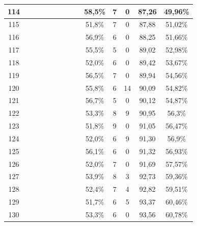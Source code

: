 \begin{longtable}{|c|c|c|c|c|c|c|c|c|c|c|c|c|c|}
114 &  \x    & \x    & \x    & \x    &       &       & \x\m  &       & 58,5\% &  7  & 0  & 87,26 & 49,96\% \\ \hline
115 &  \x    & \x    &       &       &       &       & \x    &       & 51,8\% &  7  & 0  & 87,88 & 51,02\% \\ \hline
116 &  \x    & \x    &       & \x    & \x    & \x    & \x    &       & 56,9\% &  6  & 0  & 88,25 & 51,66\% \\ \hline
117 &  \x    & \x    & \x    &       &       &       &       &       & 55,5\% &  5  & 0  & 89,02 & 52,98\% \\ \hline
118 &  \x    & \x    &       &       &       & \x    & \x    &       & 52,0\% &  6  & 0  & 89,42 & 53,67\% \\ \hline
119 &  \x    & \x    & \x    & \x    &       & \x\m  &       & \x    & 56,5\% &  7  & 0  & 89,94 & 54,56\% \\ \hline
120 &  \x    & \x    &       &       & \x    &       & \x    &       & 55,8\% &  6  & 14 & 90,09 & 54,82\% \\ \hline
121 &  \x    & \x    & \x    &       &       & \x\m  & \x\m  &       & 56,7\% &  5  & 0  & 90,12 & 54,87\% \\ \hline
122 &  \x    & \x    &       & \x    &       &       &       &       & 53,3\% &  8  & 9  & 90,95 & 56,3\% \\ \hline
123 &  \x    & \x    &       &       &       &       &       & \x\m  & 51,8\% &  9  & 0  & 91,05 & 56,47\% \\ \hline
124 &  \x    & \x    &       & \x    &       & \x\m  &       &       & 52,0\% &  6  & 9  & 91,30 & 56,9\% \\ \hline
125 &  \x    & \x    &       & \x    & \x    & \x    &       & \x    & 56,1\% &  6  & 0  & 91,32 & 56,93\% \\ \hline
126 &  \x    & \x    &       & \x    &       &       &       & \x    & 52,0\% &  7  & 0  & 91,69 & 57,57\% \\ \hline
127 &  \x    & \x    & \x    &       &       & \x\m  &       &       & 53,9\% &  8  & 3  & 92,73 & 59,36\% \\ \hline
128 &  \x    & \x    &       & \x    &       &       & \x    &       & 52,4\% &  7  & 4  & 92,82 & 59,51\% \\ \hline
129 &  \x    & \x    &       & \x    &       & \x    & \x    &       & 51,7\% &  6  & 5  & 93,37 & 60,46\% \\ \hline
130 &  \x    & \x    &       & \x    &       &       & \x\m  &       & 53,3\% &  6  & 0  & 93,56 & 60,78\% \\ \hline

\end{longtable}

